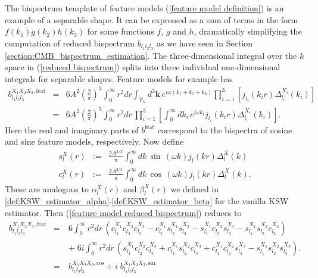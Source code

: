 The bispectrum template of feature models (\ref{feature model definition}) is an example of a separable shape. It can be expressed as a sum of terms in the form $f(k_1)g(k_2)h(k_3)$ for some functions $f$, $g$ and $h$, dramatically simplifying the computation of reduced bispectrum $b_{l_1 l_2 l_3}$ as we have seen in Section \ref{section:CMB_bispectrum_estimation}. The three-dimensional integral over the $k$ space in (\ref{reduced bispectrum}) splits into three individual one-dimensional integrals for separable shapes. Feature models for example has
\begin{eqnarray}
	b_{l_1 l_2 l_3}^{X_1 X_2 X_3,\text{feat}} &=& 6A^2 \left( \frac{2}{\pi} \right)^3 \int_0^\infty r^2 dr \int_{\mathcal{V}_k} d^3\mathbf{k}\, e^{i\omega (k_1 + k_2 + k_3)} \prod_{i=1}^{3} \left[ j_{l_i} (k_i r) \Delta_{l_i}^{X_i} (k_i) \right] \nonumber \\
	&=&  6A^2 \left( \frac{2}{\pi} \right)^3 \int_0^\infty r^2 dr \, \prod_{i=1}^{3} \left[ \int_0^\infty dk_i \, e^{i \omega k_i} j_{l_i} (k_i r) \Delta_{l_i}^{X_i} (k_i) \right]. \label{feature model reduced bispectrum}
\end{eqnarray}
Here the real and imaginary parts of $b^\text{feat}$ correspond to the bispectra of cosine and sine feature models, respectively. Now define
\begin{eqnarray}
	s_l^X(r) &:=& \frac{2A^{2/3}}{\pi} \int_0^\infty dk \, \sin\,(\omega k) j_l(kr) \Delta_l^X(k) \\
	c_l^X(r) &:=& \frac{2A^{2/3}}{\pi} \int_0^\infty dk \, \cos\,(\omega k) j_l(kr) \Delta_l^X(k).
\end{eqnarray}
These are analogous to $\alpha_l^X(r)$ and $\beta_l^X(r)$ we defined in \eqref{def:KSW_estimator_alpha}-\eqref{def:KSW_estimator_beta} for the vanilla KSW estimator. Then (\ref{feature model reduced bispectrum}) reduces to
\begin{eqnarray}
	b_{l_1 l_2 l_3}^{X_1 X_2 X_3, \text{feat}} &=& 6 \int_0^\infty r^2 dr \, \left(c_{l_1}^{X_1} c_{l_2}^{X_2} c_{l_3}^{X_3} -  c_{l_1}^{X_1} s_{l_2}^{X_2} s_{l_3}^{X_3} -  s_{l_1}^{X_1} c_{l_2}^{X_2} s_{l_3}^{X_3} -  s_{l_1}^{X_1} s_{l_2}^{X_2} c_{l_3}^{X_3} \right)  \nonumber \\
	&\quad& +\; 6i  \int_0^\infty r^2 dr \, \left(s_{l_1}^{X_1}c_{l_2}^{X_2}c_{l_3}^{X_3} + c_{l_1}^{X_1}s_{l_2}^{X_2}c_{l_3}^{X_3} +  c_{l_1}^{X_1}c_{l_2}^{X_2}s_{l_3}^{X_3} -  s_{l_1}^{X_1}s_{l_2}^{X_2}s_{l_3}^{X_3} \right). 	\nonumber \\
	&=& b_{l_1 l_2 l_3}^{X_1 X_2 X_3, \text{cos}} + i \; b_{l_1 l_2 l_3}^{X_1 X_2 X_3, \text{sin}}
	\label{feature model reduced bispectrum sin and cos}
\end{eqnarray}


